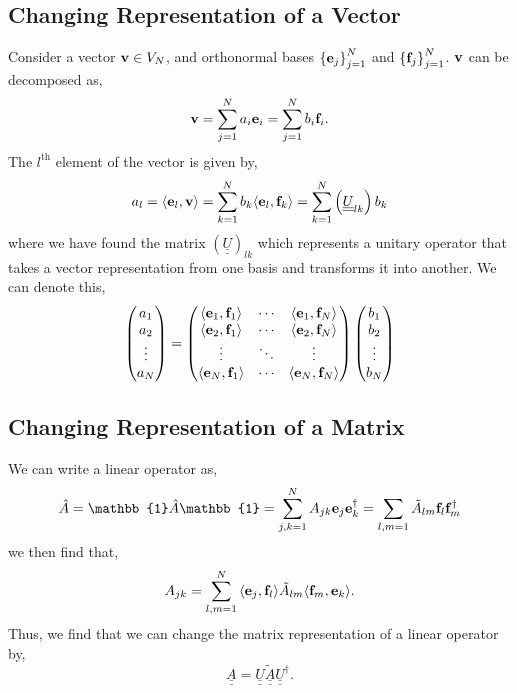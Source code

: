 \documentclass{book}
\def\innerproduct#1#2{{\langle #1},{#2 \rangle}}
\def\doubleunderline#1{\underline{\underline{#1}}}
\begin{document}
\subsection{Changing Representation of a Vector}
Consider a vector $\vb{v} \in V_N$, and orthonormal bases $\left\{\vb{e}_j\right\}_{j=1}^N$ and $\left\{\vb{f}_j\right\}_{j=1}^N$. $\vb{v}$ can be decomposed as,
\begin{equation}
		\vb{v} = \sum_{j=1}^Na_i\vb{e}_i = \sum_{j=1}^N b_i\vb{f}_i.
\end{equation}
The $l^{\text{th}}$ element of the vector is given by,
\begin{equation}
	a_l = \innerproduct{\vb{e}_l}{\vb{v}} = \sum_{k=1}^Nb_k\innerproduct{\vb{e}_l}{\vb{f}_k} = \sum_{k=1}^N\left(\doubleunderline{U}_{lk}\right)b_k
\end{equation}
where we have found the matrix $(\doubleunderline{U})_{lk}$ which represents a unitary operator that takes a vector representation from one basis and transforms it into another. We can denote this,
\begin{equation}
	\begin{pmatrix}
		a_1 \\ a_2 \\ \vdots \\ a_N
	\end{pmatrix} = \begin{pmatrix}
	\innerproduct{\vb{e}_1}{\vb{f}_1} & \cdots & \innerproduct{\vb{e}_1}{\vb{f}_N} \\
	\innerproduct{\vb{e}_2}{\vb{f}_1} & \cdots & \innerproduct{\vb{e}_2}{\vb{f}_N} \\
	\vdots & \ddots & \vdots \\
	\innerproduct{\vb{e}_N}{\vb{f}_1} & \cdots & \innerproduct{\vb{e}_N}{\vb{f}_N}
	\end{pmatrix}\begin{pmatrix}
	b_1 \\ b_2 \\ \vdots \\ b_N
	\end{pmatrix}
\end{equation} 
\subsection{Changing Representation of a Matrix}
We can write a linear operator as,
\begin{equation}
	\hat{A} = \mathbb{1}\hat{A} \mathbb{1} = \sum_{j,k=1}^NA_{jk}\vb{e}_j\vb{e}_k^{\dag} = \sum_{l,m=1} \tilde{A}_{lm}\vb{f}_l\vb{f}_m^{\dag}
\end{equation}
we then find that,
\begin{equation}
	A_{jk} = \sum_{l,m=1}^N \innerproduct{\vb{e}_j}{\vb{f}_l}\tilde{A}_{lm}\innerproduct{\vb{f}_m}{\vb{e}_k}.
\end{equation}
Thus, we find that we can change the matrix representation of a linear operator by,
\begin{equation}
	\doubleunderline{A} = \doubleunderline{U}\doubleunderline{\tilde{A}}\doubleunderline{U}^{\dag}.
\end{equation}
\end{document}
